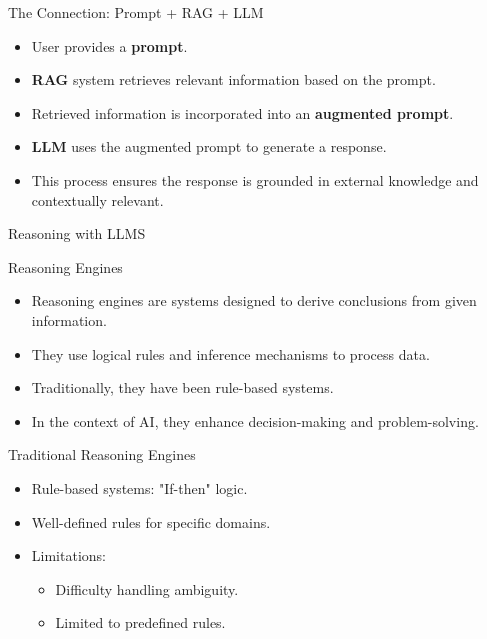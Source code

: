 \begin{frame}{The Connection: Prompt + RAG + LLM}
  \begin{itemize}
    \item User provides a \textbf{prompt}.
    \item \textbf{RAG} system retrieves relevant information based on the prompt.
    \item Retrieved information is incorporated into an \textbf{augmented prompt}.
    \item \textbf{LLM} uses the augmented prompt to generate a response.
    \item This process ensures the response is grounded in external knowledge and contextually relevant.
  \end{itemize}
\end{frame}
\begin{frame}{}
\Huge
\centering
Reasoning with LLMS
\end{frame}
\begin{frame}{Reasoning Engines}
  \begin{itemize}
    \item Reasoning engines are systems designed to derive conclusions from given information.
    \item They use logical rules and inference mechanisms to process data.
    \item Traditionally, they have been rule-based systems.
    \item In the context of AI, they enhance decision-making and problem-solving.
  \end{itemize}
\end{frame}

\begin{frame}{Traditional Reasoning Engines}
  \begin{itemize}
    \item Rule-based systems: "If-then" logic.
    \item Well-defined rules for specific domains.
    \item Limitations:
      \begin{itemize}
        \item Difficulty handling ambiguity.
        \item Limited to predefined rules.
      \end{itemize}
  \end{itemize}
\end{frame}

